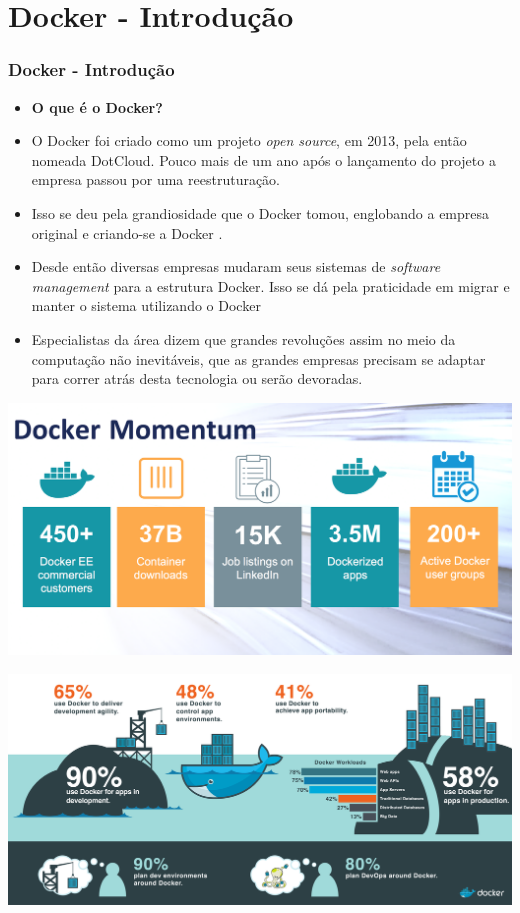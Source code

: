 \documentclass[10pt]{beamer}
\theoremstyle{remark}
\theoremstyle{definition}
\begin{document}
\section{Docker - Introdução}
\begin{frame}[allowframebreaks]
\frametitle{Docker - Introdução}
	\begin{itemize}
		\item \textbf{O que é o Docker?}
		\item O Docker foi criado como um projeto \textit{open source}, em 2013, pela então nomeada DotCloud. Pouco mais de um ano após o lançamento do projeto a empresa passou por uma reestruturação.
		\item Isso se deu pela grandiosidade que o Docker tomou, englobando a empresa original e criando-se a Docker \texttrademark.
	\end{itemize}
	
	\framebreak
	
	\begin{itemize}
		\item Desde então diversas empresas mudaram seus sistemas de \textit{software management} para a estrutura Docker. Isso se dá pela praticidade em migrar e manter o sistema utilizando o Docker
		\item Especialistas da área dizem que grandes revoluções assim no meio da computação não inevitáveis, que as grandes empresas precisam se adaptar para correr atrás desta tecnologia ou serão devoradas.
		
	\end{itemize}
	
	\framebreak
	
	\includegraphics[width=1\textwidth]{images/01.jpg} 
	
	\framebreak
	
	\includegraphics[width=1\textwidth]{images/Docker_Supply-chain-V1.5-01.png} 
	

\end{frame}
\end{document}
